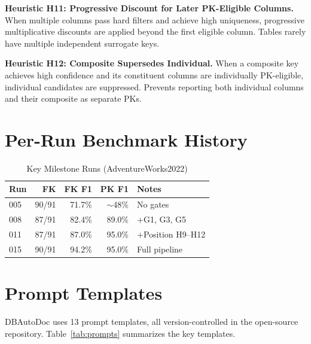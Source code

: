 \documentclass[twocolumn]{svjour3}
\begin{document}
\textbf{Heuristic H11: Progressive Discount for Later PK-Eligible Columns.} When multiple columns pass hard filters and achieve high uniqueness, progressive multiplicative discounts are applied beyond the first eligible column. Tables rarely have multiple independent surrogate keys.

\textbf{Heuristic H12: Composite Supersedes Individual.} When a composite key achieves high confidence and its constituent columns are individually PK-eligible, individual candidates are suppressed. Prevents reporting both individual columns and their composite as separate PKs.


\section{Per-Run Benchmark History}

\begin{table}[htbp]
\caption{Key Milestone Runs (AdventureWorks2022)}
\label{tab:history}
\centering
\begin{tabular}{lrrrp{3cm}}
\toprule
\textbf{Run} & \textbf{FK} & \textbf{FK F1} & \textbf{PK F1} & \textbf{Notes} \\
\midrule
005 & 90/91 & 71.7\% & $\sim$48\% & No gates \\
008 & 87/91 & 82.4\% & 89.0\% & +G1, G3, G5 \\
011 & 87/91 & 87.0\% & 95.0\% & +Position H9--H12 \\
015 & 90/91 & 94.2\% & 95.0\% & Full pipeline \\
\bottomrule
\end{tabular}
\end{table}


\section{Prompt Templates}\label{app:prompts}

DBAutoDoc uses 13 prompt templates, all version-controlled in the open-source repository. Table~\ref{tab:prompts} summarizes the key templates.
\end{document}
